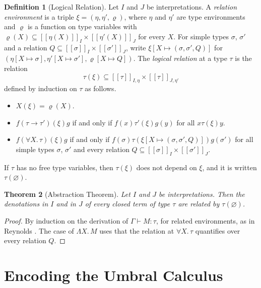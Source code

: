 \documentclass[11pt,a4paper]{report}
\theoremstyle{plain}
\newtheorem{theorem}{Theorem}[chapter]
\theoremstyle{definition}
\newtheorem{definition}[theorem]{Definition}
\theoremstyle{remark}
\newcommand{\den}[2]{[\![#1]\!]_{#2}}
\begin{document}
\begin{definition}[Logical Relation]
\label{def:logrel}
Let $I$ and $J$ be interpretations. A \emph{relation
environment} is a triple $\xi = (\eta, \eta', \varrho)$, where $\eta$ and $\eta'$
are type environments and $\varrho$ is a function on type variables with
$\varrho(X) \subseteq \den{\eta(X)}{I} \times \den{\eta'(X)}{J}$ for every $X$.
For simple types $\sigma$, $\sigma'$ and a relation
$Q \subseteq \den{\sigma}{I} \times \den{\sigma'}{J}$, write
$\xi[X \mapsto (\sigma, \sigma', Q)]$ for
$(\eta[X \mapsto \sigma], \eta'[X \mapsto \sigma'], \varrho[X \mapsto Q])$.
The \emph{logical relation} at a type $\tau$ is the relation
\[
  \tau(\xi) \subseteq \den{\tau}{I,\eta} \times \den{\tau}{J,\eta'}
\]
defined by induction on $\tau$ as follows.
\begin{itemize}
\item $X(\xi) = \varrho(X)$.
\item $f \mathrel{(\tau \to \tau')(\xi)} g$ if and only if
  $f(x) \mathrel{\tau'(\xi)} g(y)$ for all $x \mathrel{\tau(\xi)} y$.
\item $f \mathrel{(\forall X.\, \tau)(\xi)} g$ if and only if
  $f(\sigma) \mathrel{\tau(\xi[X \mapsto (\sigma, \sigma', Q)])} g(\sigma')$
  for all simple types $\sigma$, $\sigma'$ and every relation
  $Q \subseteq \den{\sigma}{I} \times \den{\sigma'}{J}$.
\end{itemize}
If $\tau$ has no free type variables, then $\tau(\xi)$ does not depend on
$\xi$, and it is written $\tau(\varnothing)$.
\end{definition}

\begin{theorem}[Abstraction Theorem]
\label{thm:abstraction-precise}
Let $I$ and $J$ be interpretations. Then the denotations in $I$ and in $J$ of
every closed term of type $\tau$ are related by $\tau(\varnothing)$.
\end{theorem}

\begin{proof}
By induction on the derivation of $\Gamma \vdash M : \tau$, for related
environments, as in Reynolds \cite{Reynolds1983}. The case of $\Lambda X.\, M$
uses that the relation at $\forall X.\, \tau$ quantifies over every relation $Q$.
\end{proof}

\section{Encoding the Umbral Calculus}
\label{sec:encoding}
\end{document}

